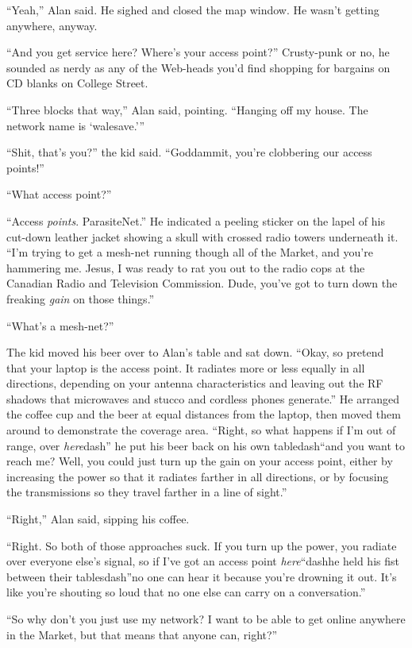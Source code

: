 ``Yeah,'' Alan said.  He sighed and closed the map window.  He wasn't
getting anywhere, anyway.

``And you get service here?  Where's your access point?'' Crusty-punk
or no, he sounded as nerdy as any of the Web-heads you'd find shopping
for bargains on CD blanks on College Street.

``Three blocks that way,'' Alan said, pointing.  ``Hanging off my
house.  The network name is `walesave.'''

``Shit, that's you?'' the kid said.  ``Goddammit, you're clobbering
our access points!''

``What access point?''

``Access \textit{points}.  ParasiteNet.'' He indicated a peeling
sticker on the lapel of his cut-down leather jacket showing a skull
with crossed radio towers underneath it.  ``I'm trying to get a
mesh-net running though all of the Market, and you're hammering me. 
Jesus, I was ready to rat you out to the radio cops at the Canadian
Radio and Television Commission.  Dude, you've got to turn down the
freaking \textit{gain} on those things.''

``What's a mesh-net?''

The kid moved his beer over to Alan's table and sat down.  ``Okay, so
pretend that your laptop is the access point.  It radiates more or
less equally in all directions, depending on your antenna
characteristics and leaving out the RF shadows that microwaves and
stucco and cordless phones generate.'' He arranged the coffee cup and
the beer at equal distances from the laptop, then moved them around to
demonstrate the coverage area.  ``Right, so what happens if I'm out of
range, over \textit{here}dash{}'' he put his beer back on his own
tabledash{}``and you want to reach me?  Well, you could just turn up the
gain on your access point, either by increasing the power so that it
radiates farther in all directions, or by focusing the transmissions
so they travel farther in a line of sight.''

``Right,'' Alan said, sipping his coffee.

``Right.  So both of those approaches suck.  If you turn up the power,
you radiate over everyone else's signal, so if I've got an access
point \textit{here}``dash{}he held his fist between their tablesdash{}''no one
can hear it because you're drowning it out.  It's like you're shouting
so loud that no one else can carry on a conversation.''

``So why don't you just use my network?  I want to be able to get
online anywhere in the Market, but that means that anyone can,
right?''

